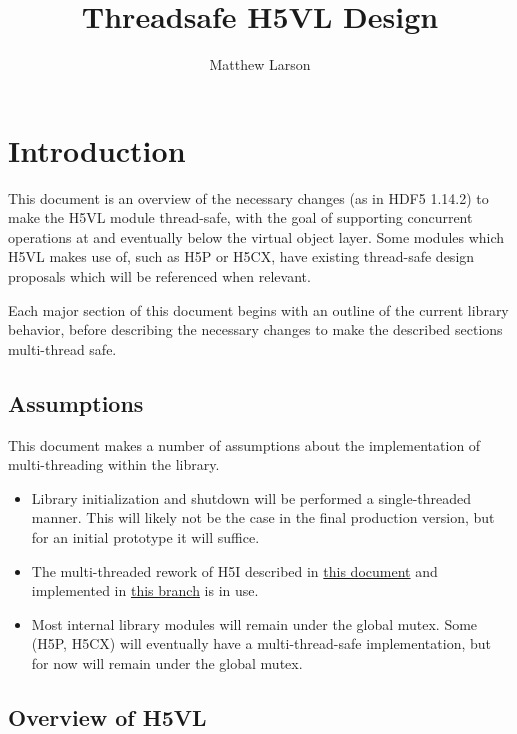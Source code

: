 \documentclass{article}
\title{Threadsafe H5VL Design}
\author{Matthew Larson}
\begin{document}
\maketitle

\tableofcontents

\newpage
\section{Introduction}

This document is an overview of the necessary changes (as in HDF5 1.14.2) to make the H5VL module thread-safe, with the goal of supporting concurrent operations at and eventually below the virtual object layer. Some modules which H5VL makes use of, such as H5P or H5CX, have existing thread-safe design proposals which will be referenced when relevant.

Each major section of this document begins with an outline of the current library behavior, before describing the necessary changes to make the described sections multi-thread safe.

\subsection{Assumptions}

This document makes a number of assumptions about the implementation of multi-threading within the library.

\begin{itemize}
    \item Library initialization and shutdown will be performed a single-threaded manner. This will likely not be the case in the final production version, but for an initial prototype it will suffice.

    \item The multi-threaded rework of H5I described in \href{https://github.com/LifeboatLLC/MT-HDF5/blob/main/design_docs/H5I-2024-07-30.pdf}{this document} and implemented in \href{https://github.com/LifeboatLLC/Experimental/tree/1_14_2_multithread}{this branch} is in use.

    \item Most internal library modules will remain under the global mutex. Some (H5P, H5CX) will eventually have a multi-thread-safe implementation, but for now will remain under the global mutex.
\end{itemize}

\subsection{Overview of H5VL}
\end{document}
